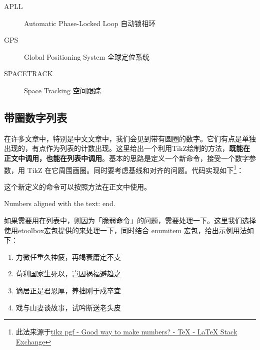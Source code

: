 \begin{codeshow}
    \begin{description}
        \item[APLL] 
        Automatic Phase-Locked Loop
        自动锁相环
        \item[GPS] Global 
        Positioning System 全球定位系统
        \item[SPACETRACK] 
        Space Tracking 空间跟踪
    \end{description}
\end{codeshow}

\subsection{带圈数字列表}

在许多文章中，特别是中文文章中，我们会见到带有圆圈的数字。它们有点是单独出现的，有点作为列表的计数出现。这里给出一个利用TikZ绘制的方法，\textbf{既能在正文中调用，也能在列表中调用}。基本的思路是定义一个新命令，接受一个数字参数，用 TikZ 在它周围画圈。同时要考虑基线和对齐的问题。代码实现如下\footnote{此法来源于\href{http://tex.stackexchange.com/questions/7032/good-way-to-make-textcircled-numbers}{tikz pgf - Good way to make  numbers? - TeX - LaTeX Stack Exchange}}：

\begin{latex}
\usepackage{tikz}
\usepackage{etoolbox}
\newcommand{\circled}[2][]{\tikz[baseline=(char.base)]
    {\node[shape = circle, draw, inner sep = 1pt]
        (char) {\phantom{\ifblank{#1}{#2}{#1}}};%
        \node at (char.center) {\makebox[0pt][c]{#2}};}}
\robustify{\circled}
\end{latex}

这个新定义的命令可以按照方法在正文中使用。

\begin{codeshow}
Numbers aligned with the text:     end.
\end{codeshow}

如果需要用在列表中，则因为「脆弱命令」的问题，需要处理一下。这里我们选择使用etoolbox宏包提供的来处理一下，同时结合 enumitem 宏包，给出示例用法如下：

\begin{codeshow}
\begin{enumerate}[label=\dcircled{\arabic*}, noitemsep]
    \item 力微任重久神疲，再竭衰庸定不支
    \item 苟利国家生死以，岂因祸福避趋之
    \item 谪居正是君恩厚，养拙刚于戍卒宜
    \item 戏与山妻谈故事，试吟断送老头皮
\end{enumerate}
\end{codeshow}



